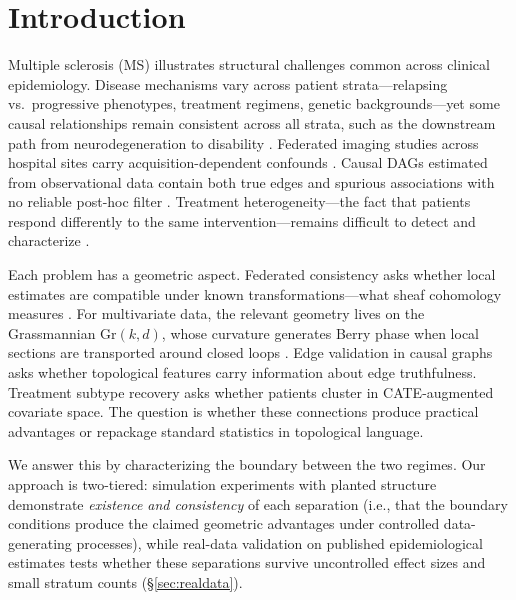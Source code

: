 \documentclass{article}
\newcommand{\Gr}{\mathrm{Gr}}
\begin{document}
\begin{abstract}
When the boundary conditions are absent, geometry reduces to standard tools or fails: a degree-deficit feature (Forman--Ricci curvature) discriminates true from false edges (AUROC $= 0.677$) while Ollivier--Ricci curvature, which measures global transport, scores below chance ($0.466$), and PCA-based dimensionality reduction destroys treatment effect signal regardless of CATE estimator quality.
\end{abstract}

\section{Introduction}
\label{sec:intro}

Multiple sclerosis (MS) illustrates structural challenges common across clinical epidemiology.
Disease mechanisms vary across patient strata---relapsing vs.\ progressive phenotypes, treatment regimens, genetic backgrounds---yet some causal relationships remain consistent across all strata, such as the downstream path from neurodegeneration to disability \citep{lublin2014defining}.
Federated imaging studies across hospital sites carry acquisition-dependent confounds \citep{fortin2018harmonization}.
Causal DAGs estimated from observational data contain both true edges and spurious associations with no reliable post-hoc filter \citep{glymour2019review}.
Treatment heterogeneity---the fact that patients respond differently to the same intervention---remains difficult to detect and characterize \citep{athey2016recursive}.

Each problem has a geometric aspect.
Federated consistency asks whether local estimates are compatible under known transformations---what sheaf cohomology measures \citep{robinson2014topological, curry2014sheaves}.
For multivariate data, the relevant geometry lives on the Grassmannian $\Gr(k,d)$, whose curvature generates Berry phase when local sections are transported around closed loops \citep{berry1984quantal, simon1983holonomy}.
Edge validation in causal graphs asks whether topological features carry information about edge truthfulness.
Treatment subtype recovery asks whether patients cluster in CATE-augmented covariate space.
The question is whether these connections produce practical advantages or repackage standard statistics in topological language.

We answer this by characterizing the boundary between the two regimes.
Our approach is two-tiered: simulation experiments with planted structure demonstrate \emph{existence and consistency} of each separation (i.e., that the boundary conditions produce the claimed geometric advantages under controlled data-generating processes), while real-data validation on published epidemiological estimates tests whether these separations survive uncontrolled effect sizes and small stratum counts (\S\ref{sec:realdata}).
\end{document}
